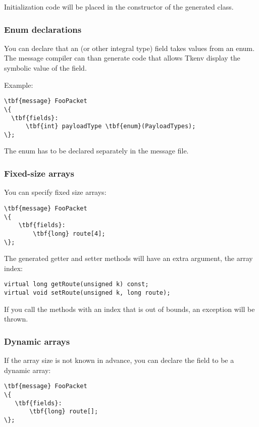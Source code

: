 Initialization code will be placed in the constructor of the generated class.


\subsubsection{Enum declarations}

You can declare that an  (or other integral type) field
takes values from an enum. The message compiler can than generate code
that allows Tkenv display the symbolic value of the field.

Example:

\begin{Verbatim}[commandchars=\\\{\}]
\tbf{message} FooPacket
\{
  \tbf{fields}:
      \tbf{int} payloadType \tbf{enum}(PayloadTypes);
\};
\end{Verbatim}

The enum has to be declared separately in the message file.


\subsubsection{Fixed-size arrays}

You can specify fixed size arrays:

\begin{Verbatim}[commandchars=\\\{\}]
\tbf{message} FooPacket
\{
    \tbf{fields}:
        \tbf{long} route[4];
\};
\end{Verbatim}

The generated getter and setter methods will have an extra  argument,
the array index:

\begin{verbatim}
virtual long getRoute(unsigned k) const;
virtual void setRoute(unsigned k, long route);
\end{verbatim}

If you call the methods with an index that is out of bounds, an exception
will be thrown.


\subsubsection{Dynamic arrays}

If the array size is not known in advance, you can declare the field
to be a dynamic array:

\begin{Verbatim}[commandchars=\\\{\}]
\tbf{message} FooPacket
\{
   \tbf{fields}:
       \tbf{long} route[];
\};
\end{Verbatim}

